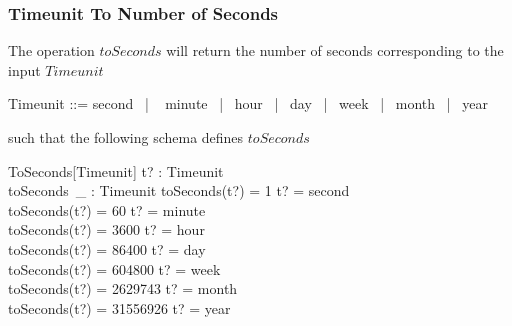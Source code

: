 \documentclass[../../main.tex]{subfiles}
\begin{document}
\subsubsection{Timeunit To Number of Seconds}

The operation $toSeconds$ will return the number of seconds corresponding to the input $Timeunit$
\begin{zed}
  Timeunit ::= second ~| ~ minute ~| ~hour ~| ~day ~| ~week ~| ~month ~| ~year
\end{zed}
such that the following schema defines $toSeconds$
\begin{schema}{ToSeconds[Timeunit]}
  t? : Timeunit \\
  toSeconds~\_ : Timeunit \pfun \nat
  \where
  toSeconds(t?) = 1 \iff t? = second \\
  toSeconds(t?) = 60 \iff t? = minute \\
  toSeconds(t?) = 3600 \iff t? = hour \\
  toSeconds(t?) = 86400 \iff t? = day \\
  toSeconds(t?) = 604800 \iff t? = week \\
  toSeconds(t?) = 2629743 \iff t? = month \\
  toSeconds(t?) = 31556926 \iff t? = year
\end{schema}
\end{document}

